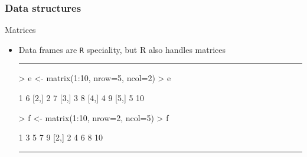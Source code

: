 \documentclass{beamer}
\begin{document}
\begin{frame}[fragile]
	\frametitle{Data structures}
	\centering \LARGE Matrices
	\begin{itemize}
		\small
	\item Data frames are \texttt{R} speciality, but R also handles matrices
\rule{\textwidth}{0.4pt}
\tiny
\begin{Schunk}
\begin{Sinput}
> e <- matrix(1:10, nrow=5, ncol=2)
> e
\end{Sinput}
\begin{Soutput}
     [,1] [,2]
[1,]    1    6
[2,]    2    7
[3,]    3    8
[4,]    4    9
[5,]    5   10
\end{Soutput}
\end{Schunk}
\vspace{20pt}
\begin{Schunk}
\begin{Sinput}
> f <-  matrix(1:10, nrow=2, ncol=5)
> f
\end{Sinput}
\begin{Soutput}
     [,1] [,2] [,3] [,4] [,5]
[1,]    1    3    5    7    9
[2,]    2    4    6    8   10
\end{Soutput}
\end{Schunk}
\rule{\textwidth}{0.4pt}\\
\small
	\end{itemize}
\end{frame}
\end{document}
